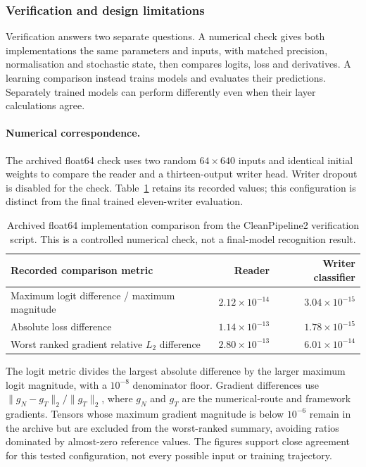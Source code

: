 \subsubsection{Verification and design limitations}
\label{sec:des-netverify}
Verification answers two separate questions. A numerical check gives both implementations the same parameters and inputs, with matched precision, normalisation and stochastic state, then compares logits, loss and derivatives. A learning comparison instead trains models and evaluates their predictions. Separately trained models can perform differently even when their layer calculations agree.

\paragraph{Numerical correspondence.}
The archived float64 check uses two random $64\times640$ inputs and identical initial weights to compare the reader and a thirteen-output writer head. Writer dropout is disabled for the check. Table~\ref{tab:des-numericalcheck} retains its recorded values; this configuration is distinct from the final trained eleven-writer evaluation.

\begin{table}[H]\centering\small
\begin{tabularx}{\linewidth}{|X|r|r|}
\hline\textbf{Recorded comparison metric}&\textbf{Reader}&\textbf{Writer classifier}\\\hline
Maximum logit difference / maximum magnitude&$2.12\times10^{-14}$&$3.04\times10^{-15}$\\\hline
Absolute loss difference&$1.14\times10^{-13}$&$1.78\times10^{-15}$\\\hline
Worst ranked gradient relative $L_2$ difference&$2.80\times10^{-13}$&$6.01\times10^{-14}$\\\hline
\end{tabularx}
\caption{Archived float64 implementation comparison from the CleanPipeline2 verification script. This is a controlled numerical check, not a final-model recognition result.}
\label{tab:des-numericalcheck}
\end{table}

The logit metric divides the largest absolute difference by the larger maximum logit magnitude, with a $10^{-8}$ denominator floor. Gradient differences use $\|g_N-g_T\|_2/\|g_T\|_2$, where $g_N$ and $g_T$ are the numerical-route and framework gradients. Tensors whose maximum gradient magnitude is below $10^{-6}$ remain in the archive but are excluded from the worst-ranked summary, avoiding ratios dominated by almost-zero reference values. The figures support close agreement for this tested configuration, not every possible input or training trajectory.

